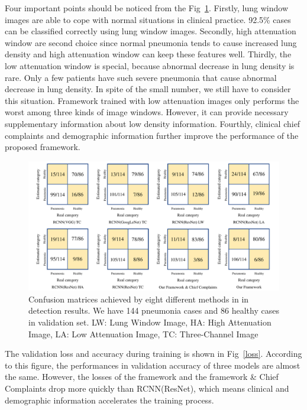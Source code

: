 \documentclass[journal]{IEEEtran}
\begin{document}
Four important points should be noticed from the Fig~\ref{Confusionmatrices}.
Firstly, lung window images are able to cope with normal situations in clinical practice. 92.5\% cases can be classified correctly using lung window images.
Secondly, high attenuation window are second choice since normal pneumonia tends to cause increased lung density and high attenuation window can keep these features well. 
Thirdly, the low attenuation window is special, because abnormal decrease in lung density is rare. Only a few patients have such severe pneumonia that cause abnormal decrease in lung density. In spite of the small number, we still have to consider this situation. Framework trained with low attenuation images only performs the worst among three kinds of image windows. However, it can provide necessary supplementary information about low density information.
Fourthly, clinical chief complaints and demographic information further improve the performance of the proposed framework.


\begin{figure}[htbp]
    \centerline{\includegraphics[width=160mm]{Confusionmatrices.pdf}}
    \vspace{-0cm}
    \caption{Confusion matrices achieved by eight different methods in in detection results. We have 144 pneumonia cases and 86 healthy cases in validation set. LW: Lung Window Image, HA: High Attenuation Image, LA: Low Attenuation Image, TC: Three-Channel Image}
    \vspace{-0cm}
    \label{Confusionmatrices}

    \end{figure}

The validation loss and accuracy during training is shown in Fig~\ref{loss}. According to this figure, the performances in validation accuracy of three models are almost the same. However, the losses of the framework and the framework \& Chief Complaints drop more quickly than RCNN(ResNet), which means clinical and demographic information accelerates the training process. 
\end{document}

